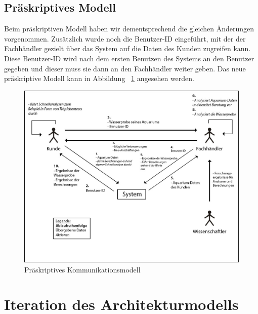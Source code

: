 \subsection{Präskriptives Modell}

Beim präskriptiven Modell haben wir dementsprechend die gleichen Änderungen vorgenommen. Zusätzlich wurde noch die Benutzer-ID eingeführt, mit der der Fachhändler gezielt über das System auf die Daten des Kunden zugreifen kann. Diese Benutzer-ID wird nach dem ersten Benutzen des Systems an den Benutzer gegeben und dieser muss sie dann an den Fachhändler weiter geben. Das neue präskriptive Modell kann in Abbildung ~\ref{komm2} angesehen werden.

\begin{figure}[htbp]
\centering
\includegraphics[width=0.85\linewidth]{Kommunikationsdiagramm2}
\caption{Präskriptives Kommunikationsmodell}
\label{komm2}
\end{figure}

\section{Iteration des Architekturmodells}

